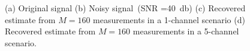 \documentclass[journal]{IEEEtran}
\theoremstyle{definition}
\begin{document}
\begin{figure}[htb]
	\hfill%
	\hfill%
	\caption{(a) Original signal (b) Noisy signal~(SNR =\SI{40}{\decibel}) (c) Recovered estimate from $M=160$ measurements in a \num{1}-channel scenario (d) Recovered estimate from $M=160$ measurements in a \num{5}-channel scenario.}
	\label{fig_synth_noisy}
\end{figure}
\end{document}

